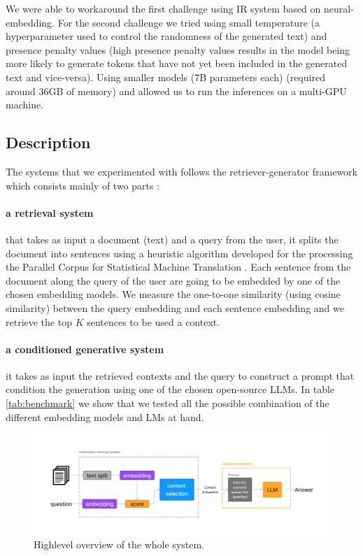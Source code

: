 \documentclass[a4paper,12pt]{article}
\begin{document}
We were able to workaround the first challenge using IR system based on neural-embedding. 
For the second challenge we tried using small temperature (a hyperparameter used to control the randomness of the generated text) and presence penalty values (high presence penalty values results in the model being more likely to 
generate tokens that have not yet been included in the generated text and vice-versa).
Using smaller models (7B parameters each) (required around 36GB of memory) and allowed us to run the inferences on a multi-GPU machine.

\subsection{Description}
The systems that we experimented with follows the retriever-generator framework which consists mainly of two parts : 

\paragraph{a retrieval system} that takes as input a document (text) and a query from the user, it splits the document into sentences using a heuristic algorithm developed for the processing the Parallel Corpus for Statistical Machine Translation \cite{europarl}. Each sentence from the document along the query of the user are going to be embedded by one of the chosen embedding models. We measure the one-to-one similarity (using cosine similarity) between the query embedding and each sentence embedding and we retrieve the top $K$ sentences to be used a context.

\paragraph{a conditioned generative system} it takes as input the retrieved contexts and the query to construct a prompt that condition the generation using one of the chosen open-source LLMs.
In table \ref{tab:benchmark} we show that we tested all the possible combination of the different embedding models and LMs at hand.

\begin{figure}[htbp]
\centering
\includegraphics[width=.9\linewidth]{figures/full.png}
\caption{Highlevel overview of the whole system.}
\label{fig:overview}
\end{figure}
\end{document}
